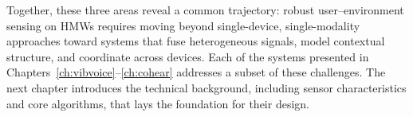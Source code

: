 Together, these three areas reveal a common trajectory: robust user--environment sensing on HMWs requires moving beyond single-device, single-modality approaches toward systems that fuse heterogeneous signals, model contextual structure, and coordinate across devices. Each of the systems presented in Chapters~\ref{ch:vibvoice}--\ref{ch:cohear} addresses a subset of these challenges. The next chapter introduces the technical background, including sensor characteristics and core algorithms, that lays the foundation for their design.



